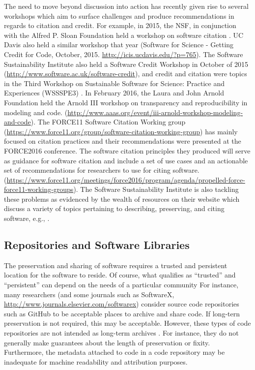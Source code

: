 \documentclass[letterpaper,11pt]{article}
\begin{document}
The need to move beyond discussion into action has recently given rise to several workshops which aim to surface challenges and produce recommendations in regards to citation and credit. For example, in 2015, the NSF, in conjunction with the Alfred P. Sloan Foundation held a workshop on software citation \citep{ahalt2015}. UC Davis also held a similar workshop that year (Software for Science -  Getting Credit for Code, October, 2015. \url{http://icis.ucdavis.edu/?p=765}). The Software Sustainability Institute also held a Software Credit Workshop in October of 2015 (\url{http://www.software.ac.uk/software-credit}), and credit and citation were topics in the Third Workshop on Sustainable Software for Science: Practice and Experiences (WSSSPE3) \citep{katz2016a}. In February 2016, the Laura and John Arnold Foundation held the Arnold III workshop on transparency and reproducibility in modeling and code. (\url{http://www.aaas.org/event/iii-arnold-workshop-modeling-and-code}).  The FORCE11 Software Citation Working group (\url{https://www.force11.org/group/software-citation-working-group}) has mainly focused on citation practices and their recommendations were presented at the FORCE2016 conference. The software citation principles they produced will serve as guidance for software citation and include a set of use cases and an actionable set of recommendations for researchers to use for citing software. (\url{https://www.force11.org/meetings/force2016/program/agenda/propelled-force-force11-working-groups}). The Software Sustainability Institute is also tackling these problems as evidenced by the wealth of resources on their website which discuss a variety of topics pertaining to describing, preserving, and citing software, e.g., \citep{hong2010,hong2014a,hong2014,jackson2012}.



\subsection{Repositories and Software Libraries}
The preservation and sharing of software requires a trusted and persistent location for the software to reside. Of course, what qualifies as “trusted” and ``persistent'' can depend on the needs of a particular community For instance, many researchers (and some journals such as SoftwareX, \url{http://www.journals.elsevier.com/softwarex}) consider source code repositories such as GitHub to be acceptable places to archive and share code. If long-tern preservation is not required, this may be acceptable. However, these types of code repositories are not intended as long-term archives \citep{fenner2015}.  For instance, they do not generally make guarantees about the length of preservation or fixity. Furthermore, the metadata attached to code in a code repository may be inadequate for machine readability and attribution purposes.
\end{document}
